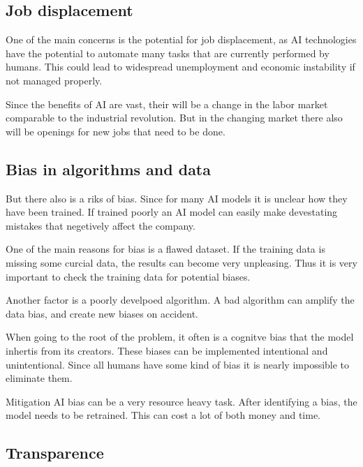 \cite{AiEconomics}

\subsection{Job displacement}
\label{subsec:job-displacement}

One of the main concerns is the potential for job displacement, as AI technologies have the potential to automate many tasks that are currently performed by humans. This could lead to widespread unemployment and economic instability if not managed properly. 

Since the benefits of AI are vast, their will be a change in the labor market comparable to the industrial revolution.  
But in the changing market there also will be openings for new jobs that need to be done. 

\cite{AiAndJobs} 

\subsection{Bias in algorithms and data}
\label{subsec:bias-in-algorithms-and-data}

But there also is a riks of bias. Since for many AI models it is unclear how they have been trained. 
If trained poorly an AI model can easily make devestating mistakes that negetively affect the company.

One of the main reasons for bias is a flawed dataset. If the training data is missing some curcial data, the results can become very unpleasing. 
Thus it is very important to check the training data for potential biases.

Another factor is a poorly develpoed algorithm. A bad algorithm can amplify the data bias, and create new biases on accident. 

When going to the root of the problem, it often is a cognitve bias that the model inhertis from its creators. 
These biases can be implemented intentional and unintentional. Since all humans have some kind of bias it is nearly impossible to eliminate them. 

Mitigation AI bias can be a very resource heavy task. After identifying a bias, the model needs to be retrained. This can cost a lot of both money and time. 

\cite{AiDataBias}

\subsection{Transparence}
\label{subsec:transparence}

